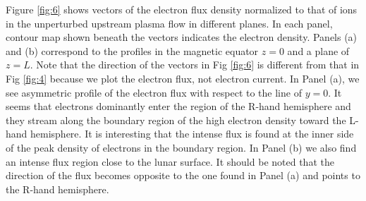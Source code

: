 \documentclass[draft,jgrga]{agutex2015}
\begin{document}
\begin{article}
Figure \ref{fig:6} shows vectors of the electron flux density 
normalized to that of ions in the unperturbed upstream plasma flow
in different planes.
%
In each panel, contour map shown beneath the vectors indicates the electron density.
Panels (a) and (b) correspond to the profiles 
in the magnetic equator $z=0$ and a plane of $z=L$. 
Note that the direction of the vectors in Fig \ref{fig:6} is
different from that in Fig \ref{fig:4} because 
we plot the electron flux, not electron current.
In Panel (a),  
we see asymmetric profile of the electron flux 
with respect to the line of $y=0$.
It seems that electrons dominantly enter the region of the R-hand hemisphere  
and they stream along the boundary region of the high electron density
toward the L-hand hemisphere.
It is interesting that the intense flux is found at the inner side of 
the peak density of electrons in the boundary region.
In Panel (b)
we also find an intense flux region close to the lunar surface.
It should be noted that the direction of the flux becomes 
opposite to the one found in Panel (a) and points to the R-hand hemisphere.


\end{article}
\end{document}
